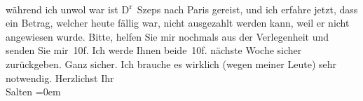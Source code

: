 \begin{ledgroupsized}[t]{13cm}
           während ich unwol war ist D\textsuperscript{r} Szeps nach Paris gereist,
               und ich erfahre jetzt, dass ein Betrag, welcher heute
               fällig war, nicht ausgezahlt werden kann, weil er nicht angewiesen wurde. Bitte,
               helfen Sie mir nochmals aus der Verlegenheit und senden Sie mir 10f. Ich werde Ihnen
               beide 10f. nächste Woche sicher zurückgeben. Ganz sicher. Ich brauche es wirklich
               (wegen meiner Leute) sehr notwendig.\pend
           \pstart
           Herzlichst Ihr {\\[\baselineskip]}\spacefill\mbox{Salten}\pend
           \leftskip=0em{}
         
         \endnumbering{}\end{ledgroupsized}  \newcommand{\dateiname}{L03285}\newcommand{\titel}{Felix Salten an Arthur Schnitzler, 10. 12. 1898}\newcommand{\editorInnen}{Martin Anton Müller und Laura Untner}
      
